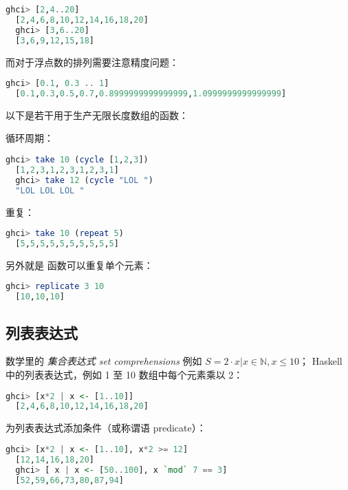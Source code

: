 \documentclass[./main.tex]{subfiles}
\begin{document}
\begin{lstlisting}[language=Haskell]
  ghci> [2,4..20]
  [2,4,6,8,10,12,14,16,18,20]
  ghci> [3,6..20]
  [3,6,9,12,15,18]
\end{lstlisting}

而对于浮点数的排列需要注意精度问题：

\begin{lstlisting}[language=Haskell]
  ghci> [0.1, 0.3 .. 1]
  [0.1,0.3,0.5,0.7,0.8999999999999999,1.0999999999999999]
\end{lstlisting}

以下是若干用于生产无限长度数组的函数：

 循环周期：

\begin{lstlisting}[language=Haskell]
  ghci> take 10 (cycle [1,2,3])
  [1,2,3,1,2,3,1,2,3,1]
  ghci> take 12 (cycle "LOL ")
  "LOL LOL LOL "
\end{lstlisting}

 重复：

\begin{lstlisting}[language=Haskell]
  ghci> take 10 (repeat 5)
  [5,5,5,5,5,5,5,5,5,5]
\end{lstlisting}

另外就是  函数可以重复单个元素：

\begin{lstlisting}[language=Haskell]
  ghci> replicate 3 10
  [10,10,10]
\end{lstlisting}

\subsection*{列表表达式}

数学里的 \textit{集合表达式 set comprehensions} 例如 $S = { 2 \cdot x | x \in \mathbb{N}, x \le 10 }$；
Haskell 中的列表表达式，例如 1 至 10 数组中每个元素乘以 2：

\begin{lstlisting}[language=Haskell]
  ghci> [x*2 | x <- [1..10]]
  [2,4,6,8,10,12,14,16,18,20]
\end{lstlisting}

为列表表达式添加条件（或称谓语 predicate）：

\begin{lstlisting}[language=Haskell]
  ghci> [x*2 | x <- [1..10], x*2 >= 12]
  [12,14,16,18,20]
  ghci> [ x | x <- [50..100], x `mod` 7 == 3]
  [52,59,66,73,80,87,94]
\end{lstlisting}
\end{document}
